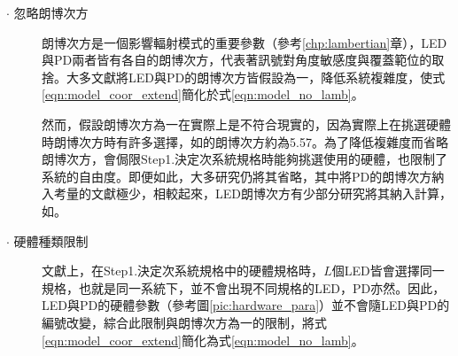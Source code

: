     \begin{description}
        \item[$\cdot$ 忽略朗博次方] \hfill
        
        \qquad
        朗博次方是一個影響輻射模式的重要參數（參考\ref{chp:lambertian}章），LED與PD兩者皆有各自的朗博次方，代表著訊號對角度敏感度與覆蓋範位的取捨。大多文獻將LED與PD的朗博次方皆假設為一，降低系統複雜度，使式\ref{eqn:model_coor_extend}簡化於式\ref{eqn:model_no_lamb}。

        \qquad
        然而，假設朗博次方為一在實際上是不符合現實的，因為實際上在挑選硬體時朗博次方時有許多選擇，如\cite{datasheet:led_vsma}的朗博次方約為5.57。為了降低複雜度而省略朗博次方，會侷限Step1.決定次系統規格時能夠挑選使用的硬體，也限制了系統的自由度\cite{survey_light2018}。即便如此，大多研究仍將其省略，其中將PD的朗博次方納入考量的文獻極少\cite{survey_light2018}，相較起來，LED朗博次方有少部分研究將其納入計算，如\cite{case:cart2d}\cite{case:cart3d}。
        
        

        \item[$\cdot$ 硬體種類限制]\hfill
        
        \qquad
        文獻上，在Step1.決定次系統規格中的硬體規格時，$L$個LED皆會選擇同一規格，也就是同一系統下，並不會出現不同規格的LED，PD亦然。因此，LED與PD的硬體參數（參考圖\ref{pic:hardware_para}）並不會隨LED與PD的編號改變，綜合此限制與朗博次方為一的限制，將式\ref{eqn:model_coor_extend}簡化為式\ref{eqn:model_no_lamb}。


\end{description}
